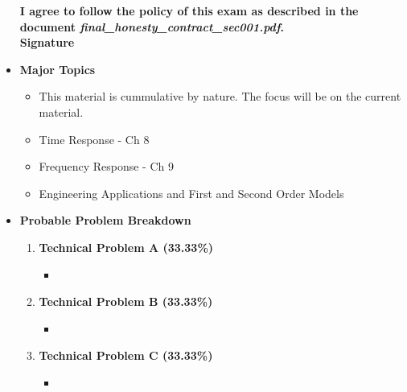\documentclass[11pt]{article}
\begin{document}
\begin{itemize}
\begin{itemize}
\end{itemize}
\begin{framed}
		 \textbf{\Large I \underline{\hspace{50mm}} agree to follow the policy of this exam as described in the document {\it final\_honesty\_contract\_sec001.pdf}.  }\vspace{3mm}\\
		 \textbf{\Large Signature \underline{\hspace{100mm} }}\\
\end{framed}
	
\newpage
\item  \textbf{\Large Major Topics}\\
	\begin{itemize}

		\item  {\large This material is cummulative by nature. The focus will be on the current material.}\\
		\item  {\large Time Response - Ch 8}
		\item  {\large Frequency Response - Ch 9}
		\item  {\large Engineering Applications and First and Second Order Models}
		



	\end{itemize}

\item  \textbf{\Large Probable Problem Breakdown}\\
\Large
	\begin{enumerate}


		\item  \textbf{\Large Technical Problem A (33.33\%)}\\
		\begin{itemize}
			\item 
		\end{itemize}
		\item  \textbf{\Large Technical Problem B (33.33\%)}\\
		\begin{itemize}
			\item 
		\end{itemize}
		\item  \textbf{\Large Technical Problem C (33.33\%)}\\
		\begin{itemize}
			\item 


\end{itemize}
\end{enumerate}
\end{itemize}
\end{document}

